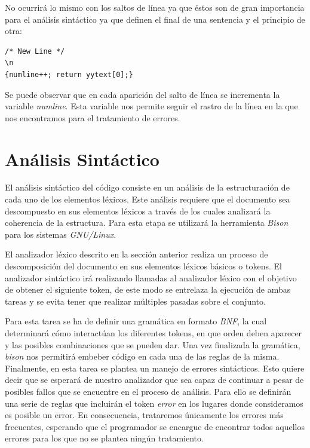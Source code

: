 \documentclass[a4paper,10pt]{article}
\begin{document}
No ocurrirá lo mismo con los saltos de línea ya que éstos son de gran importancia para el análisis sintáctico ya que definen el final de una sentencia y el principio de otra:

\begin{lstlisting}
/* New Line */
\n		 															{numline++; return yytext[0];}
\end{lstlisting}

Se puede observar que en cada aparición del salto de línea se incrementa la variable \emph{numline}. Esta variable nos permite seguir el rastro de la línea en la que nos encontramos para el tratamiento de errores.

\section{Análisis Sintáctico}

El análisis sintáctico del código consiste en un análisis de la estructuración de cada uno de los elementos léxicos. Este análisis requiere que el documento sea descompuesto en sus elementos léxicos a través de los cuales analizará la coherencia de la estructura. Para esta etapa se utilizará la herramienta \emph{Bison}\cite{bison} para los sistemas \textit{GNU/Linux}.

El analizador léxico descrito en la sección anterior realiza un proceso de descomposición del documento en sus elementos léxicos básicos o tokens. El analizador sintáctico irá realizando llamadas al analizador léxico con el objetivo de obtener el siguiente token, de este modo se entrelaza la ejecución de ambas tareas y se evita tener que realizar múltiples pasadas sobre el conjunto.

Para esta tarea se ha de definir una gramática en formato \textit{BNF}, la cual determinará cómo interactúan los diferentes tokens, en que orden deben aparecer y las posibles combinaciones que se pueden dar. Una vez finalizada la gramática, \textit{bison} nos permitirá embeber código en cada una de las reglas de la misma. Finalmente, en esta tarea se plantea un manejo de errores sintácticos. Esto quiere decir que se esperará de nuestro analizador que sea capaz de continuar a pesar de posibles fallos que se encuentre en el proceso de análisis. Para ello se definirán una serie de reglas que incluirán el token \emph{error} en los lugares donde consideramos es posible un error. En consecuencia, trataremos únicamente los errores más frecuentes, esperando que el programador se encargue de encontrar todos aquellos errores para los que no se plantea ningún tratamiento.
\end{document}

